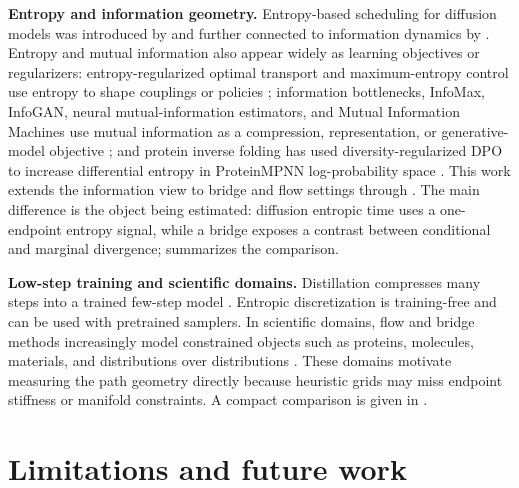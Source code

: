 \documentclass{article}
\theoremstyle{plain}
\theoremstyle{definition}
\theoremstyle{remark}
\begin{document}
\textbf{Entropy and information geometry.} Entropy-based scheduling for diffusion models was introduced by \citet{stancevic2025entropic} and further connected to information dynamics by \citet{stancevic2026information}. Entropy and mutual information also appear widely as learning objectives or regularizers: entropy-regularized optimal transport and maximum-entropy control use entropy to shape couplings or policies \citep{cuturi2013sinkhorn,ziebart2008maximum,haarnoja2018soft}; information bottlenecks, InfoMax, InfoGAN, neural mutual-information estimators, and Mutual Information Machines use mutual information as a compression, representation, or generative-model objective \citep{tishby2000information,bell1995infomax,chen2016infogan,belghazi2018mine,livne2019mim}; and protein inverse folding has used diversity-regularized DPO to increase differential entropy in ProteinMPNN log-probability space \citep{park2024peptidedpo}. This work extends the information view to bridge and flow settings through . The main difference is the object being estimated: diffusion entropic time uses a one-endpoint entropy signal, while a bridge exposes a contrast between conditional and marginal divergence;  summarizes the comparison.

\textbf{Low-step training and scientific domains.} Distillation compresses many steps into a trained few-step model \citep{gushchin2025ibmd,he2024cdbm,ai2026jointdistillation,passaro2026stochasticfewstep}. Entropic discretization is training-free and can be used with pretrained samplers. In scientific domains, flow and bridge methods increasingly model constrained objects such as proteins, molecules, materials, and distributions over distributions \citep{jing2024alphafoldmeetsflowmatching,proteina2025,bioemu2024,irwin2024molflow,miller2024flowmm,haviv2025wasserstein}. These domains motivate measuring the path geometry directly because heuristic grids may miss endpoint stiffness or manifold constraints. A compact comparison is given in .
\section{Limitations and future work}
\label{sec:limitations}

\end{document}
